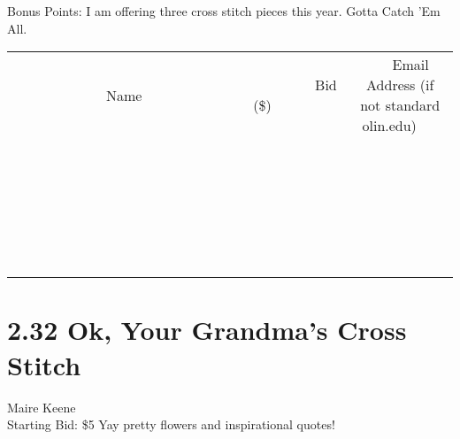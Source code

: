 \documentclass[11pt]{article}
\begin{document}
Bonus Points: I am offering three cross stitch pieces this year. 
Gotta Catch 'Em  All.
\\[6ex]
\begin{tabular}{c c c}
~~~~~~~~~~~~~Name~~~~~~~~~~~~~ & ~~~~~~~~~Bid (\$)~~~~~~~~~  & ~~~Email Address (if not standard olin.edu)~~~\\
 & & \\
\hline
 & & \\
\hline
 & & \\
\hline
 & & \\
\hline
 & & \\
\hline
 & & \\
\hline
 & & \\
\hline
 & & \\
\hline
 & & \\
\hline
 & & \\
\hline
 & & \\
\hline
 & & \\
\hline
 & & \\
\hline
 & & \\
\hline
 & & \\
\hline
 & & \\
\hline
 & & \\
\hline
 & & \\
\hline
 & & \\
\hline
 & & \\
\hline
 & & \\
\hline
 & & \\
\hline
 & & \\
\hline
 & & \\
\hline
 & & \\
\hline
 & & \\
\hline
\end{tabular}
\newpage
\section*{2.32 Ok, Your Grandma's Cross Stitch}
Maire Keene
\\
Starting Bid: \$5
\newline
Yay pretty flowers and inspirational quotes!
\end{document}
